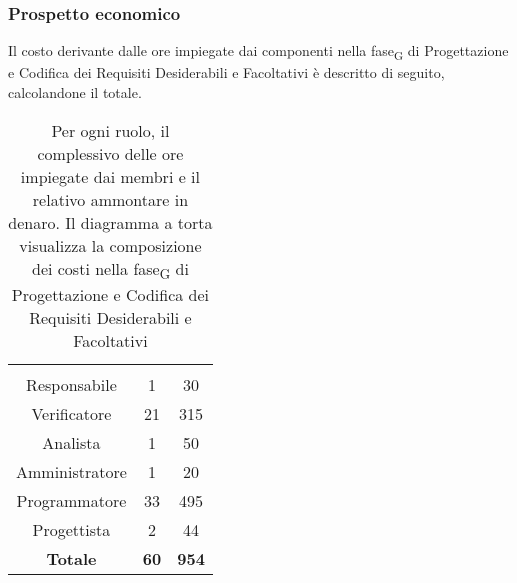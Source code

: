 \subsubsection{Prospetto economico}
Il costo derivante dalle ore impiegate dai componenti nella \gls{fase}\textsubscript{G} di Progettazione e Codifica dei Requisiti Desiderabili e Facoltativi è descritto di seguito, calcolandone il totale.

\begin{table}[H]
	{\setlength{\parindent}{0cm}
		\begin{minipage}{.43\textwidth}
			\begin{tabular}{ccc}
				\rowcolorhead
				\headertitle{Ruolo} & \headertitle{Ore} & \headertitle{Costo(\euro{})}\\
				Responsabile & 1 & 30\\
				Verificatore & 21 & 315\\
				Analista & 1 & 50\\
				Amministratore & 1 & 20\\
				Programmatore & 33 & 495\\
				Progettista & 2 & 44\\
				\hline
				\textbf{Totale} & \textbf{60} & \textbf{954}\\
			\end{tabular}
		\end{minipage}%
		\begin{minipage}{.57\textwidth}
	\end{minipage} }
	\caption[Prospetto economico della \gls{fase}\textsubscript{G} di Progettazione e Codifica dei Requisiti Desiderabili e Facoltativi]{Per ogni ruolo, il complessivo delle ore impiegate dai membri e il relativo ammontare in denaro. Il diagramma a torta visualizza la composizione dei costi nella \gls{fase}\textsubscript{G} di Progettazione e Codifica dei Requisiti Desiderabili e Facoltativi}
\end{table}







